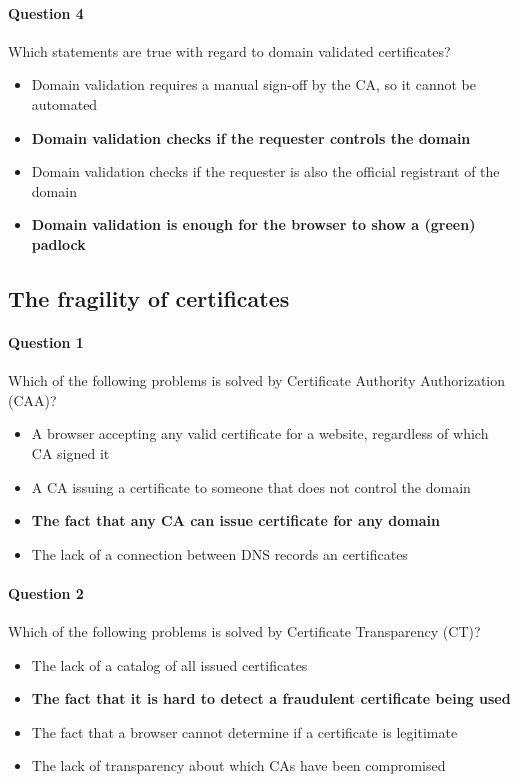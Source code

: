 \documentclass[titlepage]{article}
\begin{document}
    \paragraph{Question 4} Which statements are true with regard to domain validated certificates?
    \begin{itemize}
        \item Domain validation requires a manual sign-off by the CA, so it cannot be automated
        \item \textbf{Domain validation checks if the requester controls the domain} \checkmark
        \item Domain validation checks if the requester is also the official registrant of the domain
        \item \textbf{Domain validation is enough for the browser to show a (green) padlock} \checkmark
    \end{itemize}
    \subsection{The fragility of certificates}
    \paragraph{Question 1} Which of the following problems is solved by Certificate Authority Authorization (CAA)?
    \begin{itemize}
        \item A browser accepting any valid certificate for a website, regardless of which CA signed it
        \item A CA issuing a certificate to someone that does not control the domain
        \item \textbf{The fact that any CA can issue certificate for any domain} \checkmark
        \item The lack of a connection between DNS records an certificates
    \end{itemize}
    \paragraph{Question 2} Which of the following problems is solved by Certificate Transparency (CT)?
    \begin{itemize}
        \item The lack of a catalog of all issued certificates
        \item \textbf{The fact that it is hard to detect a fraudulent certificate being used} \checkmark
        \item The fact that a browser cannot determine if a certificate is legitimate
        \item The lack of transparency about which CAs have been compromised
    \end{itemize}
\end{document}
